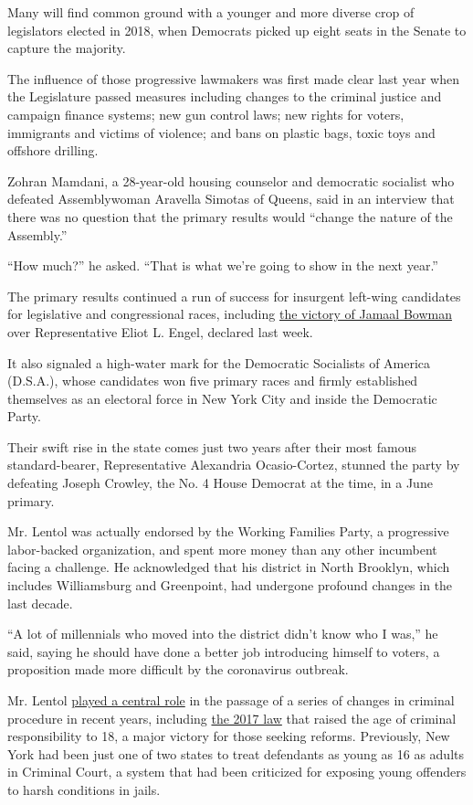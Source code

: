 Many will find common ground with a younger and more diverse crop of
legislators elected in 2018, when Democrats picked up eight seats in the
Senate to capture the majority.

The influence of those progressive lawmakers was first made clear last
year when the Legislature passed measures including changes to the
criminal justice and campaign finance systems; new gun control laws; new
rights for voters, immigrants and victims of violence; and bans on
plastic bags, toxic toys and offshore drilling.

Zohran Mamdani, a 28-year-old housing counselor and democratic socialist
who defeated Assemblywoman Aravella Simotas of Queens, said in an
interview that there was no question that the primary results would
``change the nature of the Assembly.''

``How much?'' he asked. ``That is what we're going to show in the next
year.''

The primary results continued a run of success for insurgent left-wing
candidates for legislative and congressional races, including
\href{https://www.nytimes3xbfgragh.onion/2020/07/17/nyregion/jamaal-bowman-eliot-engel.html}{the
victory of Jamaal Bowman} over Representative Eliot L. Engel, declared
last week.

It also signaled a high-water mark for the Democratic Socialists of
America (D.S.A.), whose candidates won five primary races and firmly
established themselves as an electoral force in New York City and inside
the Democratic Party.

Their swift rise in the state comes just two years after their most
famous standard-bearer, Representative Alexandria Ocasio-Cortez, stunned
the party by defeating Joseph Crowley, the No. 4 House Democrat at the
time, in a June primary.

Mr. Lentol was actually endorsed by the Working Families Party, a
progressive labor-backed organization, and spent more money than any
other incumbent facing a challenge. He acknowledged that his district in
North Brooklyn, which includes Williamsburg and Greenpoint, had
undergone profound changes in the last decade.

``A lot of millennials who moved into the district didn't know who I
was,'' he said, saying he should have done a better job introducing
himself to voters, a proposition made more difficult by the coronavirus
outbreak.

Mr. Lentol
\href{https://brooklyneagle.com/articles/2017/04/24/lentol-reveals-how-he-got-raise-the-age-passed/}{played
a central role} in the passage of a series of changes in criminal
procedure in recent years, including
\href{https://www.nytimes3xbfgragh.onion/2017/04/10/nyregion/raise-the-age-new-york.html}{the
2017 law} that raised the age of criminal responsibility to 18, a major
victory for those seeking reforms. Previously, New York had been just
one of two states to treat defendants as young as 16 as adults in
Criminal Court, a system that had been criticized for exposing young
offenders to harsh conditions in jails.

